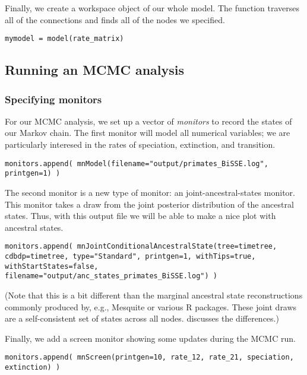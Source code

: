 Finally, we create a workspace object of our whole model.
The  function traverses all of the connections and finds all of the nodes we specified.
{\tt \begin{snugshade*}
\begin{lstlisting}
mymodel = model(rate_matrix)
\end{lstlisting}
\end{snugshade*}}

\subsection{Running an MCMC analysis}

\subsubsection{Specifying monitors}

For our MCMC analysis, we set up a vector of \emph{monitors} to record the states of our Markov chain. 
The first monitor will model all numerical variables; we are particularly interesed in the rates of speciation, extinction, and transition.
{\tt \begin{snugshade*}
\begin{lstlisting}
monitors.append( mnModel(filename="output/primates_BiSSE.log", printgen=1) )
\end{lstlisting}
\end{snugshade*}}

The second monitor is a new type of monitor: an joint-ancestral-states monitor.
This monitor takes a draw from the joint posterior distribution of the ancestral states.
Thus, with this output file we will be able to make a nice plot with ancestral states.
{\tt \begin{snugshade*}
\begin{lstlisting}
monitors.append( mnJointConditionalAncestralState(tree=timetree, cdbdp=timetree, type="Standard", printgen=1, withTips=true, withStartStates=false, filename="output/anc_states_primates_BiSSE.log") )
\end{lstlisting}
\end{snugshade*}}
(Note that this is a bit different than the marginal ancestral state reconstructions commonly produced by, e.g., Mesquite or various R packages.
These joint draws are a self-consistent set of states across all nodes.
\citet{Pagel1999} discusses the differences.)

Finally, we add a screen monitor showing some updates during the MCMC run.
{\tt \begin{snugshade*}
\begin{lstlisting}
monitors.append( mnScreen(printgen=10, rate_12, rate_21, speciation, extinction) )
\end{lstlisting}
\end{snugshade*}}

